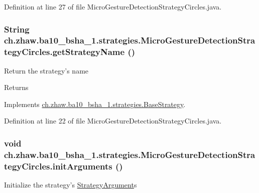 Definition at line 27 of file MicroGestureDetectionStrategyCircles.java.\hypertarget{classch_1_1zhaw_1_1ba10__bsha__1_1_1strategies_1_1MicroGestureDetectionStrategyCircles_a73a3d1a9b8047909777b53094ea99f9b}{
\subsubsection[{getStrategyName}]{\setlength{\rightskip}{0pt plus 5cm}String ch.zhaw.ba10\_\-bsha\_\-1.strategies.MicroGestureDetectionStrategyCircles.getStrategyName ()}}
\label{classch_1_1zhaw_1_1ba10__bsha__1_1_1strategies_1_1MicroGestureDetectionStrategyCircles_a73a3d1a9b8047909777b53094ea99f9b}
Return the strategy's name

\begin{DoxyReturn}{Returns}

\end{DoxyReturn}


Implements \hyperlink{classch_1_1zhaw_1_1ba10__bsha__1_1_1strategies_1_1BaseStrategy_aa0ebed55eed45409bad13d43a0058780}{ch.zhaw.ba10\_\-bsha\_\-1.strategies.BaseStrategy}.

Definition at line 22 of file MicroGestureDetectionStrategyCircles.java.\hypertarget{classch_1_1zhaw_1_1ba10__bsha__1_1_1strategies_1_1MicroGestureDetectionStrategyCircles_a4c56ad33ccc912e20e7067d5b6334102}{
\subsubsection[{initArguments}]{\setlength{\rightskip}{0pt plus 5cm}void ch.zhaw.ba10\_\-bsha\_\-1.strategies.MicroGestureDetectionStrategyCircles.initArguments ()}}
\label{classch_1_1zhaw_1_1ba10__bsha__1_1_1strategies_1_1MicroGestureDetectionStrategyCircles_a4c56ad33ccc912e20e7067d5b6334102}
Initialize the strategy's \hyperlink{classch_1_1zhaw_1_1ba10__bsha__1_1_1StrategyArgument}{StrategyArgument}s 

